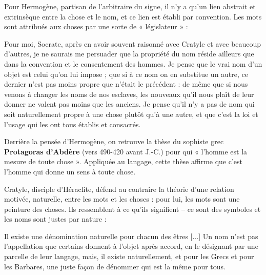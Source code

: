 Pour Hermogène, partisan de l’arbitraire du signe, il n’y a qu’un lien abstrait et extrinsèque entre la chose et le nom, et ce lien est établi par convention. Les mots sont attribués aux choses par une sorte de « législateur » :
\begin{lecture}{}
Pour moi, Socrate, après en avoir souvent raisonné avec Cratyle et avec beaucoup d’autres, je ne saurais me persuader que la propriété du nom réside ailleurs que dans la convention et le consentement des hommes. Je pense que le vrai nom d’un objet est celui qu’on lui impose ; que si à ce nom on en substitue un autre, ce dernier n’est pas moins propre que n’était le précédent : de même que si nous venons à changer les noms de nos esclaves, les nouveaux qu’il nous plaît de leur donner ne valent pas moins que les anciens. Je pense qu’il n’y a pas de nom qui soit naturellement propre à une chose plutôt qu’à une autre, et que c’est la loi et l’usage qui les ont tous établis et consacrés.
\end{lecture}
Derrière la pensée d’Hermogène, on retrouve la thèse du sophiste grec \textbf{Protagoras d’Abdère} (vers 490-420 avant J.-C.) pour qui « l’homme est la mesure de toute chose ». Appliquée au langage, cette thèse affirme que c’est l’homme qui donne un sens à toute chose.

Cratyle, disciple d’Héraclite, défend au contraire la théorie d’une relation motivée, naturelle, entre les mots et les choses : pour lui, les mots sont une peinture des choses. Ils ressemblent à ce qu’ils signifient -- ce sont des symboles et les noms sont justes par nature :
\begin{lecture}{}
Il existe une dénomination naturelle pour chacun des êtres [...] Un nom n’est pas l’appellation que certains donnent à l’objet après accord, en le désignant par une parcelle de leur langage, mais, il existe naturellement, et pour les Grecs et pour les Barbares, une juste façon de dénommer qui est la même pour tous.
\end{lecture}

